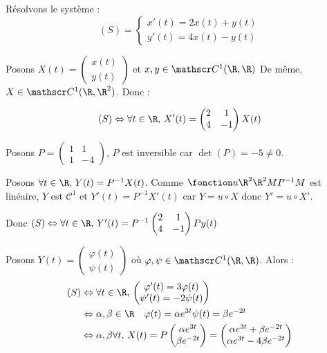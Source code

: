 \begin{exemple}
    Résolvons le système :
    \[(S) = \begin{cases}
        x'(t) = 2x(t) + y(t) \\
        y'(t) = 4x(t) - y(t)
    \end{cases}\]

    Posons $X(t) = \begin{pmatrix} x(t) \\ y(t) \end{pmatrix}$ et $x, y \in \mathscr C^1(\R,\R)$ 
     De même, $X \in \mathscr C^1(\R,\R^2)$. Donc : 
    
    \[(S) \Leftrightarrow \forall t \in \R, \, X'(t) = \begin{pmatrix} 2 & 1 \\ 4 & -1 \end{pmatrix} X(t)\]
    
    Posons $P = \begin{pmatrix} 1 & 1 \\ 1 & -4 \end{pmatrix}$, $P$ est inversible car $\det(P) = -5 \neq 0$.

    Posons $\forall t \in \R, \, Y(t) = P^{-1}X(t)$. Comme $\fonction u {\R^2}{\R^2}{M}{P^{-1}M}$ est linéaire, 
    $Y$ est $\mathscr C^1$ et $Y'(t) = P^{-1}X'(t)$ car $Y = u \circ X$ donc $Y' = u \circ X'$.

    Donc $(S) \Leftrightarrow \forall t \in \R, \, Y'(t) = P^{-1} \begin{pmatrix} 2 & 1 \\ 4 & -1 \end{pmatrix} P y(t)$

    Posons $Y(t) = \begin{pmatrix} \varphi(t) \\ \psi(t) \end{pmatrix}$ où 
    $\varphi, \psi \in \mathscr C^1(\R,\R)$. Alors : 
    \begin{align*}
        (S) & \Leftrightarrow \forall t \in \R, \, \begin{pmatrix} \varphi'(t)  = 3\varphi(t) \\ \psi'(t) = -2\psi(t) \end{pmatrix}\\
    & \Leftrightarrow \alpha, \beta \in \R \quad \varphi(t) = \alpha e^{3t} \space \psi(t) = \beta e^{-2t}\\
    & \Leftrightarrow \alpha, \beta \forall t, \, X(t) = P \begin{pmatrix} \alpha e^{3t} \\ \beta e^{-2t} \end{pmatrix} = \begin{pmatrix} \alpha e^{3t} + \beta e^{-2t} \\ \alpha e^{3t} - 4\beta e^{-2t} \end{pmatrix}
    \end{align*}
\end{exemple}

